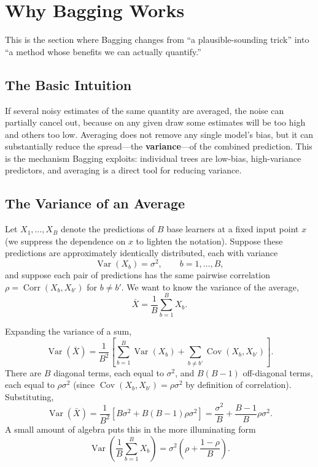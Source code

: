 \documentclass[12pt,a4paper]{article}
\begin{document}
\section{Why Bagging Works}
\label{sec:why-bagging-works}

This is the section where Bagging changes from ``a plausible-sounding trick'' into ``a method whose benefits we can actually quantify.''

\subsection{The Basic Intuition}

If several noisy estimates of the same quantity are averaged, the noise can partially cancel out, because on any given draw some estimates will be too high and others too low. Averaging does not remove any single model's bias, but it can substantially reduce the spread---the \textbf{variance}---of the combined prediction. This is the mechanism Bagging exploits: individual trees are low-bias, high-variance predictors, and averaging is a direct tool for reducing variance.

\subsection{The Variance of an Average}

Let $X_1, \ldots, X_B$ denote the predictions of $B$ base learners at a fixed input point $x$ (we suppress the dependence on $x$ to lighten the notation). Suppose these predictions are approximately identically distributed, each with variance
$$
\operatorname{Var}(X_b) = \sigma^2, \qquad b = 1, \ldots, B,
$$
and suppose each pair of predictions has the same pairwise correlation $\rho = \operatorname{Corr}(X_b, X_{b'})$ for $b \neq b'$. We want to know the variance of the average,
$$
\bar X = \frac{1}{B}\sum_{b=1}^B X_b.
$$

Expanding the variance of a sum,
$$
\operatorname{Var}(\bar X) = \frac{1}{B^2}\left[\sum_{b=1}^B \operatorname{Var}(X_b) + \sum_{b \neq b'} \operatorname{Cov}(X_b, X_{b'})\right].
$$
There are $B$ diagonal terms, each equal to $\sigma^2$, and $B(B-1)$ off-diagonal terms, each equal to $\rho \sigma^2$ (since $\operatorname{Cov}(X_b, X_{b'}) = \rho \sigma^2$ by definition of correlation). Substituting,
$$
\operatorname{Var}(\bar X) = \frac{1}{B^2}\left[B\sigma^2 + B(B-1)\rho\sigma^2\right] = \frac{\sigma^2}{B} + \frac{B-1}{B}\rho\sigma^2.
$$
A small amount of algebra puts this in the more illuminating form
\begin{equation}
\label{eq:variance-reduction}
\operatorname{Var}\!\left(\frac{1}{B}\sum_{b=1}^{B} X_b\right) = \sigma^2\left(\rho + \frac{1-\rho}{B}\right).
\end{equation}
\end{document}
